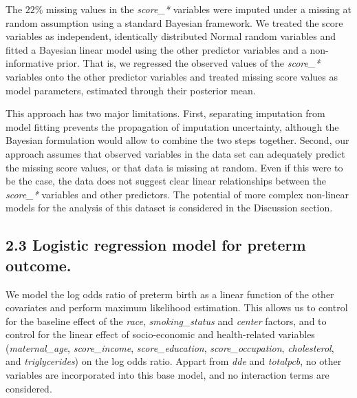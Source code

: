 \documentclass[10pt,]{article}
\begin{document}
The \(22\%\) missing values in the \emph{score\_*} variables were
imputed under a missing at random assumption using a standard Bayesian
framework. We treated the score variables as independent, identically
distributed Normal random variables and fitted a Bayesian linear model
using the other predictor variables and a non-informative prior. That
is, we regressed the observed values of the \emph{score\_*} variables
onto the other predictor variables and treated missing score values as
model parameters, estimated through their posterior mean.

This approach has two major limitations. First, separating imputation
from model fitting prevents the propagation of imputation uncertainty,
although the Bayesian formulation would allow to combine the two steps
together. Second, our approach assumes that observed variables in the
data set can adequately predict the missing score values, or that data
is missing at random. Even if this were to be the case, the data does
not suggest clear linear relationships between the \emph{score\_*}
variables and other predictors. The potential of more complex non-linear
models for the analysis of this dataset is considered in the Discussion
section.

\hypertarget{logistic-regression-model-for-preterm-outcome.}{%
\subsection{2.3 Logistic regression model for preterm
outcome.}\label{logistic-regression-model-for-preterm-outcome.}}

We model the log odds ratio of preterm birth as a linear function of the
other covariates and perform maximum likelihood estimation. This allows
us to control for the baseline effect of the \emph{race},
\emph{smoking\_status} and \emph{center} factors, and to control for the
linear effect of socio-economic and health-related variables
(\emph{maternal\_age}, \emph{score\_income}, \emph{score\_education},
\emph{score\_occupation}, \emph{cholesterol}, and \emph{triglycerides})
on the log odds ratio. Appart from \emph{dde} and \emph{totalpcb}, no
other variables are incorporated into this base model, and no
interaction terms are considered.
\end{document}
